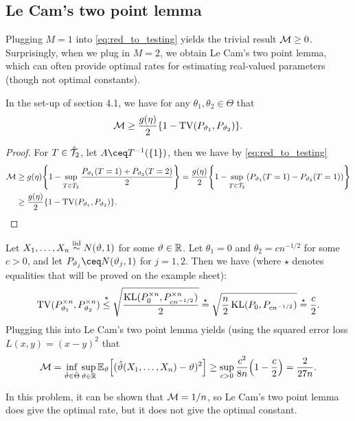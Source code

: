 \subsection{Le Cam's two point lemma}
Plugging $M = 1$ into \cref{eq:red_to_testing} yields the trivial result $\mathcal M \geq 0$. Surprisingly, when we plug in $M = 2$, we obtain Le Cam's two point lemma, which can often provide optimal rates for estimating real-valued parameters (though not optimal constants). 
\begin{lemma}
	In the set-up of section 4.1, we have for any $\theta_1, \theta_2 \in \Theta$ that 
	\[
	\mathcal M \geq \frac{g(\eta)}{2} \qty{1 - \operatorname{TV}(P_{\vartheta_1}, P_{\vartheta_2})}. 
	\]
\end{lemma}

\begin{proof}
	For $T \in \hat{\mathcal T}_2$, let $A \ceq T^{-1}(\qty{1})$, then we have by \cref{eq:red_to_testing}
	\begin{align*}
		\mathcal M &\geq g(\eta) \qty{1 - \sup_{T \in \hat T_2} \frac{P_{\vartheta_1}(T = 1) + P_{\vartheta_2}(T = 2)}{2}} = \frac{g(\eta)}{2} \qty{1 - \sup_{T \in \hat{\mathcal T}_2} \qty(P_{\vartheta_1}(T = 1) - P_{\vartheta_2}(T = 1))} \\
		&\geq \frac{g(\eta)}{2} \qty{ 1 - \operatorname{TV}(P_{\vartheta_1}, P_{\vartheta_2})}. 
	\end{align*}
\end{proof}

\begin{example}
	Let $X_1, \dotsc, X_n \overset{\mathrm{iid}}{\sim} N(\vartheta, 1)$ for some $\vartheta \in \mathbb R$. Let $\theta_1 = 0$ and $\theta_2 = c n^{-1/2}$ for some $c > 0$, and let $P_{\theta_j} \ceq N(\theta_j, 1)$ for $j = 1, 2$. Then we have (where $\star$ denotes equalities that will be proved on the example sheet):
	\[
	\operatorname{TV}(P_{\vartheta_1}^{\times n}, P_{\vartheta_2}^{\times n}) \overset\star\leq \sqrt{\frac{\operatorname{KL}(P_0^{\times n}, P_{cn^{-1/2}}^{\times n})}{2}} \overset\star= \sqrt{\frac n2 \operatorname{KL}(P_0, P_{cn^{-1/2}})} \overset\star= \frac c2. 
	\]
	Plugging this into Le Cam's two point lemma yields (using the squared error loss $L(x, y) = (x-y)^2$ that
	\[
	\mathcal M = \inf_{\hat{\vartheta} \in \hat\Theta} \sup_{\vartheta \in \mathbb R} \mathbb E_\vartheta \qty[(\hat{\vartheta}(X_1, \dotsc, X_n) - \vartheta)^2] \geq \sup_{c > 0} \frac{c^2}{8n} \qty(1 - \frac c2) = \frac2{27n}.
		\]
		
	In this problem, it can be shown that $\mathcal M = 1/n$, so Le Cam's two point lemma does give the optimal rate, but it does not give the optimal constant. 
\end{example}

